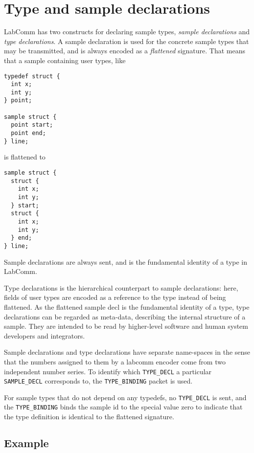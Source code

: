 \documentclass[a4paper]{article}
\begin{document}
\section{Type and sample declarations}

LabComm has two constructs for declaring sample types, \emph{sample
declarations} and \emph{type declarations}. A sample declaration is used
for the concrete sample types that may be transmitted, and is always
encoded as a \emph{flattened} signature. That means that a sample
containing user types, like

\begin{verbatim}
typedef struct {
  int x;
  int y;
} point;

sample struct {
  point start;
  point end;
} line;
\end{verbatim}

is flattened to 

\begin{verbatim}
sample struct {
  struct {
    int x;
    int y;
  } start;
  struct {
    int x;
    int y;
  } end;
} line;
\end{verbatim}

Sample declarations are always sent, and is the fundamental identity of
a type in LabComm. 

Type declarations is the hierarchical counterpart to sample
declarations: here, fields of user types are encoded as a reference to
the type instead of being flattened. As the flattened sample decl is the
fundamental identity of a type, type declarations can be regarded as
meta-data, describing the internal structure of a sample. They are
intended to be read by higher-level software and human system developers
and integrators.

Sample declarations and type declarations have separate name-spaces in
the sense that the numbers assigned to them by a labcomm encoder 
come from two independent number series. To identify which
\verb+TYPE_DECL+ a particular \verb+SAMPLE_DECL+ corresponds to, the
\verb+TYPE_BINDING+ packet is used.

For sample types that do not depend on any typedefs, no \verb+TYPE_DECL+
is sent, and the \verb+TYPE_BINDING+ binds the sample id to the special
value zero to indicate that the type definition is identical to the
flattened signature.

\subsection{Example}
\end{document}

